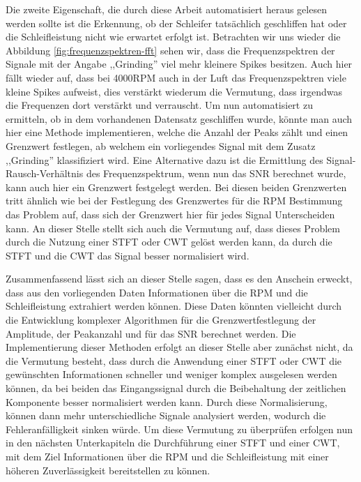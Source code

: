 Die zweite Eigenschaft, die durch diese Arbeit automatisiert heraus gelesen werden sollte ist die Erkennung, ob der Schleifer tatsächlich geschliffen hat oder die Schleifleistung nicht wie erwartet erfolgt ist. Betrachten wir uns wieder die Abbildung \ref{fig:frequenzspektren-fft} sehen wir, dass die Frequenzspektren der Signale mit der Angabe ,,Grinding'' viel mehr kleinere Spikes besitzen. Auch hier fällt wieder auf, dass bei 4000RPM auch in der Luft das Frequenzspektren viele kleine Spikes aufweist, dies verstärkt wiederum die Vermutung, dass irgendwas die Frequenzen dort verstärkt und verrauscht. Um nun automatisiert zu ermitteln, ob in dem vorhandenen Datensatz geschliffen wurde, könnte man auch hier eine Methode implementieren, welche die Anzahl der Peaks zählt und einen Grenzwert festlegen, ab welchem ein vorliegendes Signal mit dem Zusatz ,,Grinding'' klassifiziert wird. Eine Alternative dazu ist die Ermittlung des Signal-Rausch-Verhältnis des Frequenzspektrum, wenn nun das SNR berechnet wurde, kann auch hier ein Grenzwert festgelegt werden. Bei diesen beiden Grenzwerten tritt ähnlich wie bei der Festlegung des Grenzwertes für die RPM Bestimmung das Problem auf, dass sich der Grenzwert hier für jedes Signal Unterscheiden kann. An dieser Stelle stellt sich auch die Vermutung auf, dass dieses Problem durch die Nutzung einer \ac{STFT} oder \ac{CWT} gelöst werden kann, da durch die \ac{STFT} und die \ac{CWT} das Signal besser normalisiert wird.

Zusammenfassend lässt sich an dieser Stelle sagen, dass es den Anschein erweckt, dass aus den vorliegenden Daten Informationen über die RPM und die Schleifleistung extrahiert werden können. Diese Daten könnten vielleicht durch die Entwicklung komplexer Algorithmen für die Grenzwertfestlegung der Amplitude, der Peakanzahl und für das SNR berechnet werden. Die Implementierung dieser Methoden erfolgt an dieser Stelle aber zunächst nicht, da die Vermutung besteht, dass durch die Anwendung einer \ac{STFT} oder \ac{CWT} die gewünschten Informationen schneller und weniger komplex ausgelesen werden können, da bei beiden das Eingangssignal durch die Beibehaltung der zeitlichen Komponente besser normalisiert werden kann. Durch diese Normalisierung, können dann mehr unterschiedliche Signale analysiert werden, wodurch die Fehleranfälligkeit sinken würde. Um diese Vermutung zu überprüfen erfolgen nun in den nächsten Unterkapiteln die Durchführung einer \ac{STFT} und einer \ac{CWT}, mit dem Ziel Informationen über die RPM und die Schleifleistung mit einer höheren Zuverlässigkeit bereitstellen zu können.


